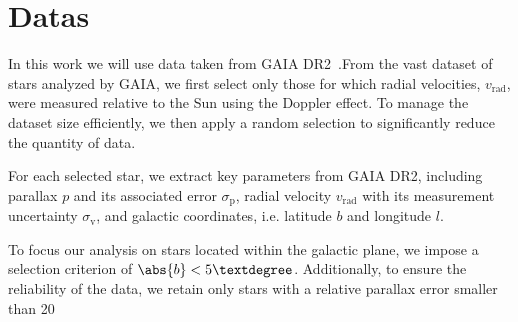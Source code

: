 \section{Datas}

In this work we will use data taken from GAIA DR2~\cite{GAIADR2}.From the vast dataset of stars analyzed by GAIA, we first select only those for which radial velocities, $v_{\text{rad}}$, were measured relative to the Sun using the Doppler effect. To manage the dataset size efficiently, we then apply a random selection to significantly reduce the quantity of data.

For each selected star, we extract key parameters from GAIA DR2, including parallax $p$ and its associated error $\sigma_{\text{p}}$, radial velocity $v_{\text{rad}}$ with its measurement uncertainty $\sigma_{\text{v}}$, and galactic coordinates, i.e. latitude $b$ and longitude $l$.

To focus our analysis on stars located within the galactic plane, we impose a selection criterion of $\abs{b} < 5°$. Additionally, to ensure the reliability of the data, we retain only stars with a relative parallax error smaller than 20%
